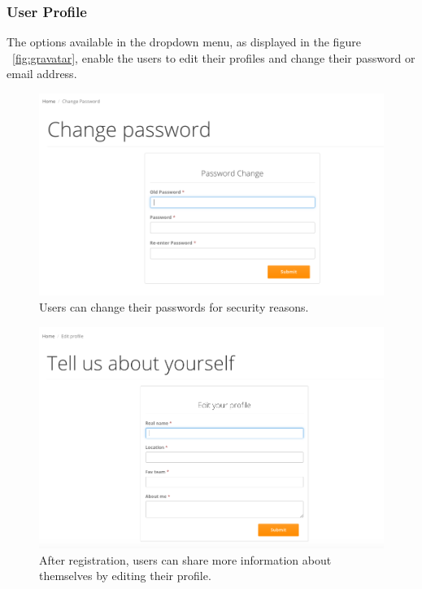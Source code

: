 \subsubsection*{User Profile}
The options available in the dropdown menu, as displayed in the figure ~\ref{fig:gravatar}, enable the users to edit their profiles and change their password or email address.

\begin{figure}[H]
	\begin{center}
		\includegraphics[width=.90\textwidth]{impl/images/changePassword}
		\caption{Users can change their passwords for security reasons.} \label{fig:changePassword}
	\end{center}
\end{figure}

\begin{figure}[H]
	\begin{center}
		\includegraphics[width=.90\textwidth]{impl/images/editProfile}
		\caption{After registration, users can share more information about themselves by editing their profile.} \label{fig:editprofile}
	\end{center}
\end{figure}

